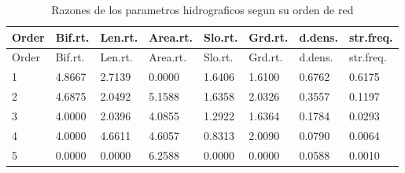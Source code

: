 \documentclass[11pt,]{article}
\begin{document}
\begin{longtable}[]{@{}llllllll@{}}
\caption{\label{tablasiete}Razones de los parametros hidrograficos segun
su orden de red}\tabularnewline
\toprule
Order & Bif.rt. & Len.rt. & Area.rt. & Slo.rt. & Grd.rt. & d.dens. &
str.freq.\tabularnewline
\midrule
\endfirsthead
\toprule
Order & Bif.rt. & Len.rt. & Area.rt. & Slo.rt. & Grd.rt. & d.dens. &
str.freq.\tabularnewline
\midrule
\endhead
1 & 4.8667 & 2.7139 & 0.0000 & 1.6406 & 1.6100 & 0.6762 &
0.6175\tabularnewline
2 & 4.6875 & 2.0492 & 5.1588 & 1.6358 & 2.0326 & 0.3557 &
0.1197\tabularnewline
3 & 4.0000 & 2.0396 & 4.0855 & 1.2922 & 1.6364 & 0.1784 &
0.0293\tabularnewline
4 & 4.0000 & 4.6611 & 4.6057 & 0.8313 & 2.0090 & 0.0790 &
0.0064\tabularnewline
5 & 0.0000 & 0.0000 & 6.2588 & 0.0000 & 0.0000 & 0.0588 &
0.0010\tabularnewline
\bottomrule
\end{longtable}
\end{document}
